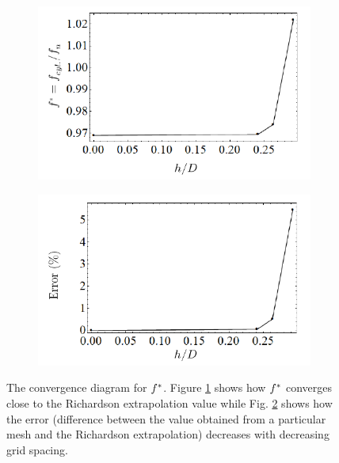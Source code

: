 \documentclass[oneside]{utmthesis}
\begin{document}
\begin{figure}
  \centering
  \begin{subfigure}[h]{0.39\textwidth}
    \includegraphics[width=\textwidth]{figs/gciFstr-1}
    \caption{}
    \label{fig:gciFstr-1}
  \end{subfigure}
  \hspace{6mm}
  \begin{subfigure}[h]{0.39\textwidth}
    \includegraphics[width=\textwidth]{figs/gciFstr-2}
    \caption{}
    \label{fig:gciFstr-2}
  \end{subfigure}
  \caption{The convergence diagram for $f^{*}$. Figure \ref{fig:gciFstr-1} shows how $f^{*}$ converges close to the Richardson extrapolation value while Fig. \ref{fig:gciFstr-2} shows how the error (difference between the value obtained from a particular mesh and the Richardson extrapolation) decreases with decreasing grid spacing.} \label{fig:gciFstr}
\end{figure}
\end{document}
